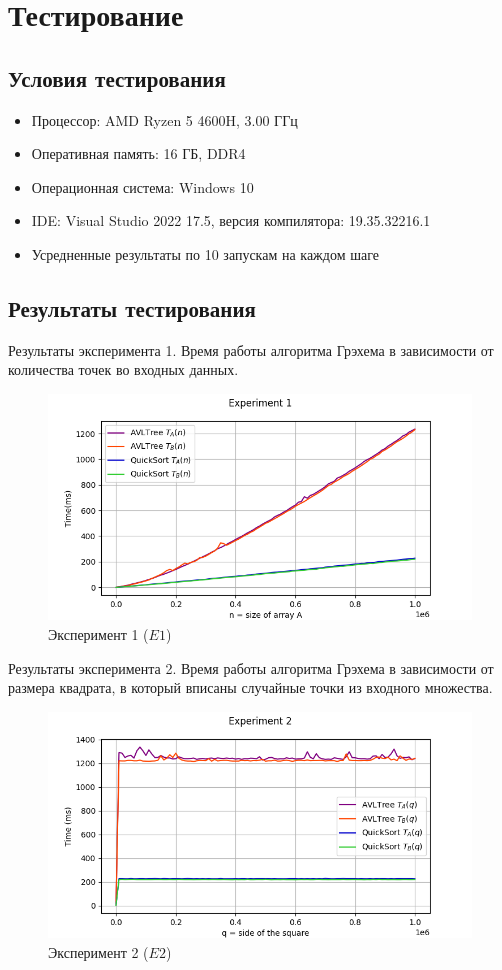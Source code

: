 \section{Тестирование}

\subsection{Условия тестирования}

\begin{itemize}
	\item{Процессор: AMD Ryzen 5 4600H, 3.00 ГГц}
	\item{Оперативная память: 16 ГБ, DDR4}
	\item{Операционная система: Windows 10}
	\item{IDE: Visual Studio 2022 17.5, версия компилятора: 19.35.32216.1}
	\item{Усредненные результаты по 10 запускам на каждом шаге}
\end{itemize}

\subsection{Результаты тестирования}

Результаты эксперимента 1. Время работы алгоритма Грэхема в зависимости от количества точек во входных данных.

\begin{figure}[h]
	\centering
	\includegraphics[width=\textwidth]{Images/Experiment_1.png}
	\caption{Эксперимент 1 ($E1$)}
	\label{fig:experiment_1}
\end{figure}

\newpage

Результаты эксперимента 2. Время работы алгоритма Грэхема в зависимости от размера квадрата, в который вписаны случайные точки из входного множества.

\begin{figure}[h]
	\centering
	\includegraphics[width=\textwidth]{Images/Experiment_2.png}
	\caption{Эксперимент 2 ($E2$)}
	\label{fig:experiment_2}
\end{figure}

\newpage